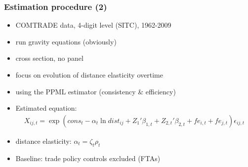 \documentclass{beamer}
\begin{document}
\begin{frame}[plain]\frametitle{Estimation procedure (2)}
\begin{itemize}
\item COMTRADE data, 4-digit level (SITC), 1962-2009
\vspace{.3cm}
\item run gravity equations (obviously)
\item cross section, no panel
\item focus on evolution of distance elasticity overtime
\vspace{.3cm}
\item using the PPML estimator (consistency \& efficiency)
\vspace{.3cm}
\item Estimated equation:
\begin{gather}
X_{ij,t}=\exp{\left(cons_t-\alpha_{t}\ln{dist_{ij}}+{Z_1}'\beta_{1,t}+{Z_{2,t}}'\beta_{2,t}+fe_{i,t}+fe_{j,t}\right)\epsilon_{ij,t}} \nonumber
\end{gather}
\item distance elasticity: $\alpha_{t}=\zeta_{t}\rho_t$
\vspace{.3cm}
\item Baseline: trade policy controls excluded (FTAs)
\end{itemize}
\end{frame}
\end{document}
